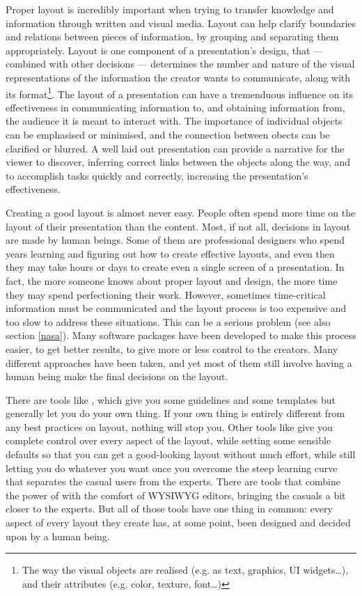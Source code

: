   Proper layout is incredibly important when trying to transfer knowledge and
   information through written and visual media. Layout can help clarify
   boundaries and relations between pieces of information, by grouping and
   separating them appropriately. Layout is one component of a presentation's
   design, that --- combined with other decisions --- determines the number and
   nature of the visual representations of the information the creator wants to
   communicate, along with its format\footnote{The way the visual objects are
   realised (e.g. as text, graphics, UI widgets\ldots), and their attributes
   (e.g. color, texture, font\ldots)}. The layout of a presentation can have a
   tremenduous influence on its effectiveness in communicating information to,
   and obtaining information from, the audience it is meant to interact with.
   The importance of individual objects can be emphasised or minimised, and the
   connection between obects can be clarified or blurred. A well laid out
   presentation can provide a narrative for the viewer to discover, inferring
   correct links between the objects along the way, and to accomplish tasks
   quickly and correctly, increasing the presentation's effectiveness.

   Creating a good layout is almost never easy. People often spend more time on
   the layout of their presentation than the content. Most, if not all,
   decisions in layout are made by human beings. Some of them are professional
   designers who spend years learning and figuring out how to create effective
   layouts, and even then they may take hours or days to create even a single
   screen of a presentation. In fact, the more someone knows about proper
   layout and design, the more time they may spend perfectioning their work.
   However, sometimes time-critical information must be communicated and the
   layout process is too expensive and too slow to address these situations.
   This can be a serious problem (see also section \ref{nasa}). Many software
   packages have been developed to make this process easier, to get better
   results, to give more or less control to the creators. Many different
   approaches have been taken, and yet most of them still involve having a
   human being make the final decisions on the layout.

   There are tools like \ppt, which give you some guidelines and some templates
   but generally let you do your own thing. If your own thing is entirely
   different from any best practices on layout, nothing will stop you. Other
   tools like \latex give you complete control over every aspect of the layout,
   while setting some sensible defaults so that you can get a good-looking
   layout without much effort, while still letting you do whatever you want
   once you overcome the steep learning curve that separates the casual users
   from the experts. There are tools that combine the power of \latex with the
   comfort of WYSIWYG editors, bringing the casuals a bit closer to the
   experts. But all of those tools have one thing in common: every aspect of
   every layout they create has, at some point, been designed and decided upon
   by a human being.


